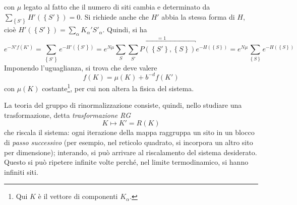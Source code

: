 \documentclass[11pt, a4paper]{scrartcl}
\theoremstyle{style}
\theoremstyle{style1}
\numberwithin{equation}{subsection}
\begin{document}
con $\mu $ legato al fatto che il numero di siti cambia e determinato da $\sum_{\left\{ S' \right\} }^{} H' \left(\left\{ S' \right\} \right) = 0$.
Si richiede anche che $H'$ abbia la stessa forma di $H$, cio\`e $H'\left(\left\{ S' \right\} \right) = \sum_{\alpha }^{} K_\alpha ' S'_\alpha $.
Quindi, si ha
\[
	e^{-N' f(K')}= \sum_{\left\{ S' \right\} }^{} e^{-H' \left(\left\{ S' \right\} \right) }= e ^{N \mu }\sum_{S}^{} \overbracket{\sum_{S'}^{} P\left(\left\{ S' \right\} , \left\{ S \right\}\right)    }^{=1} e^{-H\left(\left\{ S \right\} \right) } = e^{N\mu }\sum_{\left\{ S \right\} }^{} e^{-H\left(\left\{ S \right\} \right) }
\] 
Imponendo l'uguaglianza, si trova che deve valere
\[
f(K) = \mu (K) + b ^{-d}f(K')
\] 
con $\mu (K)$ costante\footnote{Qui $K$ \`e il vettore di componenti $K_\alpha $.}, per cui non altera la fisica del sistema.

La teoria del gruppo di rinormalizzazione consiste, quindi, nello studiare una trasformazione, detta \textit{trasformazione RG}
\[
K \longmapsto K' = R(K)
\] 
che riscala il sistema: ogni iterazione della mappa raggruppa un sito in un blocco di \textit{passo successivo} (per esempio, nel reticolo quadrato, si incorpora un altro sito per dimensione); interando, si pu\`o arrivare al riscalamento del sistema desiderato.
Questo si pu\`o ripetere infinite volte perch\'e, nel limite termodinamico, si hanno infiniti siti.
\end{document}

